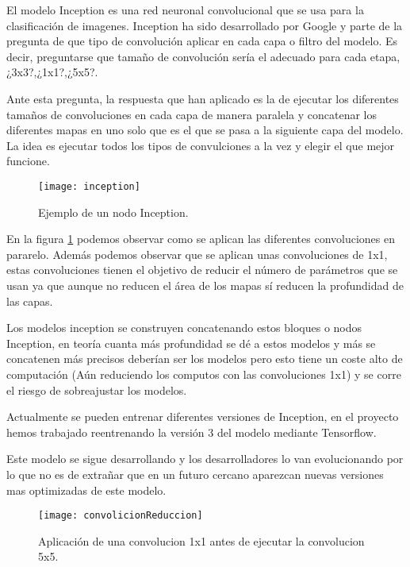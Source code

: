El modelo Inception es una red neuronal convolucional que se usa para la clasificación de imagenes. Inception ha sido desarrollado por Google y parte de la pregunta de que tipo de convolución aplicar en cada capa o  filtro del modelo. Es decir, preguntarse que tamaño de convolución sería el adecuado para cada etapa, ¿3x3?,¿1x1?,¿5x5?.\cite{depthwiseSeparableConvolutions}

Ante esta pregunta, la respuesta que han aplicado es la de ejecutar los diferentes tamaños de convoluciones en cada capa de manera paralela y concatenar los diferentes mapas en uno solo que es el que se pasa a la siguiente capa del modelo. La idea es ejecutar todos los tipos de convulciones a la vez y elegir el que mejor funcione.

\begin{figure}[h]
    \begin{center}%
        \begin{center}%
          \texttt{[image: inception]}%
          \caption{Ejemplo de un nodo Inception.}%
          \label{figinception}%
        \end{center}%
  	\end{center}%
\end{figure}%

En la figura \ref{figinception} podemos observar como se aplican las diferentes convoluciones en pararelo. Además podemos observar que se aplican unas convoluciones de 1x1, estas convoluciones tienen el objetivo de reducir el número de parámetros que se usan ya que aunque no reducen el área de los mapas sí reducen la profundidad de las capas.\cite{inception}

Los modelos inception se construyen concatenando estos bloques o nodos Inception, en teoría cuanta más profundidad se dé a estos modelos y más se concatenen más precisos deberían ser los modelos pero esto tiene un coste alto de computación (Aún reduciendo los computos con las convoluciones 1x1) y se corre el riesgo de sobreajustar los modelos.

Actualmente se pueden entrenar diferentes versiones de Inception, en el proyecto hemos trabajado reentrenando la versión 3 del modelo mediante Tensorflow.

Este modelo se sigue desarrollando y los desarrolladores lo van evolucionando por lo que no es de extrañar que en un futuro cercano aparezcan nuevas versiones mas optimizadas de este modelo.

\begin{figure}[h]
    \begin{center}%
        \begin{center}%
          \texttt{[image: convolicionReduccion]}%
          \caption{Aplicación de una convolucion 1x1 antes de ejecutar la convolucion 5x5.}%
          \label{figconvolicionReduccion}%
        \end{center}%
  	\end{center}%
\end{figure}%


